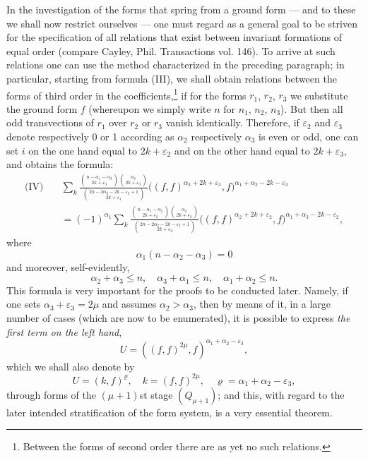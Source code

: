 \documentclass[10pt]{article}
\begin{document}
In the investigation of the forms that spring from a ground form --- and to these we shall now restrict ourselves --- one must regard as a general goal to be striven for the specification of all relations that exist between invariant formations of equal order (compare Cayley, Phil. Transactions vol. 146). To arrive at such relations one can use the method characterized in the preceding paragraph; in particular, starting from formula (III), we shall obtain relations between the forms of third order in the coefficients,\footnote{Between the forms of second order there are as yet no such relations.} if for the forms $r_1$, $r_2$, $r_3$ we substitute the ground form $f$ (whereupon we simply write $n$ for $n_1$, $n_2$, $n_3$). But then all odd transvections of $r_1$ over $r_2$ or $r_3$ vanish identically. Therefore, if $\varepsilon_2$ and $\varepsilon_3$ denote respectively 0 or 1 according as $\alpha_2$ respectively $\alpha_3$ is even or odd, one can set $i$ on the one hand equal to $2k+\varepsilon_2$ and on the other hand equal to $2k+\varepsilon_3$, and obtains the formula:
\[
\begin{aligned}
\text{(IV)}\quad
&\sum_k\frac{\binom{n-\alpha_1-\alpha_3}{2k+\varepsilon_3}\binom{\alpha_3}{2k+\varepsilon_3}}{\binom{2n-2\alpha_3-2k-\varepsilon_3+1}{2k+\varepsilon_3}}\bigl((f,f)^{\alpha_3+2k+\varepsilon_3},f\bigr)^{\alpha_1+\alpha_2-2k-\varepsilon_3}\\
&=(-1)^{\alpha_1}\sum_k\frac{\binom{n-\alpha_1-\alpha_2}{2k+\varepsilon_2}\binom{\alpha_2}{2k+\varepsilon_2}}{\binom{2n-2\alpha_2-2k-\varepsilon_2+1}{2k+\varepsilon_2}}\bigl((f,f)^{\alpha_2+2k+\varepsilon_2},f\bigr)^{\alpha_1+\alpha_3-2k-\varepsilon_2},
\end{aligned}
\]
where
\[
\alpha_1(n-\alpha_2-\alpha_3)=0
\]
and moreover, self-evidently,
\[
\alpha_2+\alpha_3\leq n,\quad \alpha_3+\alpha_1\leq n,\quad \alpha_1+\alpha_2\leq n.
\]
This formula is very important for the proofs to be conducted later. Namely, if one sets $\alpha_3+\varepsilon_3=2\mu$ and assumes $\alpha_2>\alpha_3$, then by means of it, in a large number of cases (which are now to be enumerated), it is possible to express \emph{the first term on the left hand},
\[
U=((f,f)^{2\mu},f)^{\alpha_1+\alpha_2-\varepsilon_3},
\]
which we shall also denote by
\[
U=(k,f)^\varrho,\quad k=(f,f)^{2\mu},\quad \varrho=\alpha_1+\alpha_2-\varepsilon_3,
\]
through forms of the $(\mu+1)$st stage $(Q_{\mu+1})$; and this, with regard to the later intended stratification of the form system, is a very essential theorem.
\end{document}
